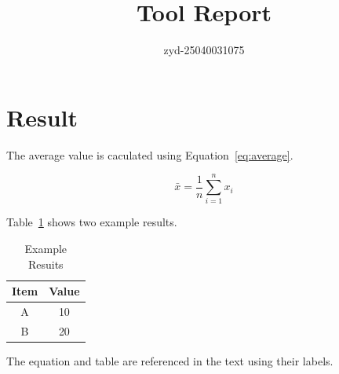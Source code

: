 \documentclass{article}
\begin{document}
\title{Tool Report}
\author{zyd-25040031075}
\maketitle

\section{Result}

The average value is caculated using Equation~\eqref{eq:average}.

\begin{equation}
\bar{x} = \frac{1}{n}\sum_{i=1}^{n}x_i
\label{eq:average}
\end{equation}

Table~\ref{tab:example} shows two example results.

\begin{table}[h]
\centering
\caption{Example Resuits}
\label{tab:example}
\begin{tabular}{cc}
\hline
Item & Value \\
\hline
A & 10 \\
B & 20 \\
\hline
\end{tabular}
\end{table}

The equation and table are referenced in the text using their labels.
\end{document}

